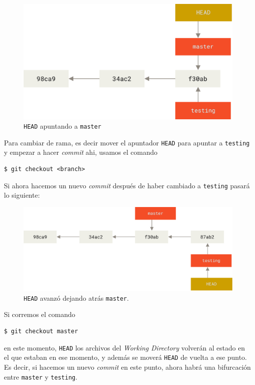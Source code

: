 \documentclass[spanish, 12pt, a4paper]{article}
\begin{document}
\begin{figure}[h]
  \centering
  \includegraphics[width=\textwidth]{figs/head-to-master.png}
  \caption{\texttt{HEAD} apuntando a \texttt{master}}
\end{figure}

Para cambiar de rama, es decir mover el apuntador \texttt{HEAD} para apuntar a \texttt{testing} y empezar a hacer \textit{commit} ahi, usamos el comando
\begin{lstlisting}
$ git checkout <branch>
\end{lstlisting}

Si ahora hacemos un nuevo \textit{commit} después de haber cambiado a \texttt{testing} pasará lo siguiente: 

\begin{figure}[h]
  \centering
  \includegraphics[width=\textwidth]{figs/advance-testing.png}
  \caption{\texttt{HEAD} avanzó dejando atrás \texttt{master}.}
\end{figure}

Si corremos el comando
\begin{lstlisting}
$ git checkout master
\end{lstlisting}
en este momento, \texttt{HEAD} los archivos del \textit{Working Directory} volverán al estado en el que estaban en ese momento, y además se moverá \texttt{HEAD} de vuelta a ese punto.
Es decir, si hacemos un nuevo \textit{commit} en este punto, ahora habrá una bifurcación entre \texttt{master} y \texttt{testing}.
\end{document}

